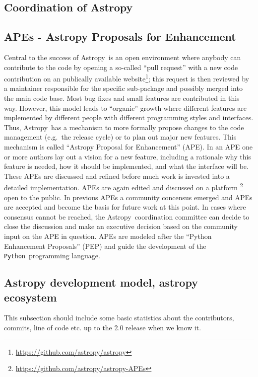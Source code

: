 \documentclass[modern]{aastex61}
\newcommand{\package}[1]{\texttt{#1}}
\newcommand{\python}{\package{Python}}
\newcommand{\astropy}{Astropy}
\begin{document}
\subsection{Coordination of Astropy}

\subsection{APEs - Astropy Proposals for Enhancement}
Central to the success of \astropy\ is an open environment where
anybody can contribute to the code by opening a so-called ``pull
request'' with a new code contribution on an publically available
website\footnote{\url{https://github.com/astropy/astropy}}; this
request is then reviewed by a maintainer responsible for the specific
sub-package and possibly merged into the main code base. Most bug
fixes and small features are contributed in this way. However, this
model leads to ``organic'' growth where different features are
implemented by different people with different programming styles and
interfaces. Thus, \astropy\ has a mechanism to more formally propose
changes to the code management (e.g.\ the release cycle) or to plan
out major new features. This mechanism is called ``Astropy Proposal
for Enhancement'' (APE). In an APE one or more authors lay out a
vision for a new feature, including a rationale why this feature is
needed, how it should be implemented, and what the interface will
be. These APEs are discussed and refined before much work is invested
into a detailed implementation. APEs are again edited and discussed on
a platform \footnote{\url{https://github.com/astropy/astropy-APEs}}
open to the public. In previous APEs a community concensus emerged and
APEs are accepted and become the basis for future work at this
point. In cases where consensus cannot be reached, the
\astropy\ coordination committee can decide to close the discussion and
make an executive decision based on the community input on the APE in
question. APEs are modeled after the ``Python Enhancement Proposals''
(PEP) and guide the development of the \python\ programming language.


\subsection{Astropy development model, astropy ecosystem}
This subsection should include some basic statistics about the contributors, commits, line of code etc. up to the 2.0 release when we know it.
\end{document}

